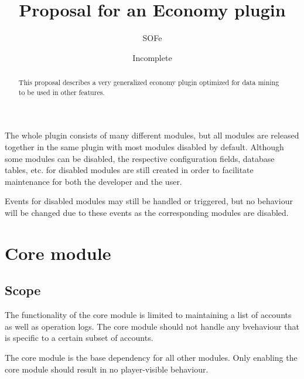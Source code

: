 \documentclass{report}
\title{Proposal for an Economy plugin}
\date{Incomplete}
\author{SOFe}
\begin{document}

	\maketitle
	\tableofcontents

	\begin{abstract}
		This proposal describes a very generalized economy plugin optimized for data mining to be used in other features.
	\end{abstract}

	The whole plugin consists of many different modules, but all modules are released together in the same plugin with most modules disabled by default.
	Although some modules can be disabled, the respective configuration fields, database tables, etc. for disabled modules are still created
	in order to facilitate maintenance for both the developer and the user.

	Events for disabled modules may still be handled or triggered,
	but no behaviour will be changed due to these events as the corresponding modules are disabled.

	\part{Core module}
		\chapter{Scope}
			The functionality of the core module is limited to maintaining a list of accounts as well as operation logs.
			The core module should not handle any bvehaviour that is specific to a certain subset of accounts.

			The core module is the base dependency for all other modules. Only enabling the core module should result in no player-visible behaviour.
\end{document}
